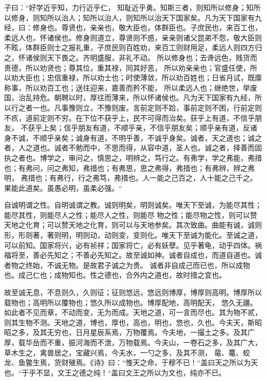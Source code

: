 \documentclass[]{article}
\begin{document}
子曰：``好学近乎知，力行近乎仁，
知耻近乎勇。知斯三者，则知所以修身；知所以修身，则知所以治人；知所以治人，则知所以治天下国家矣。凡为天下国家有九经，曰：修身也。尊贤也，亲亲也，敬大臣也，体群臣也。子庶民也，来百工也，柔远人也，怀诸侯也。修身则道立，尊贤则不惑，亲亲则诸父昆弟不怨，敬大臣则不眩，体群臣则士之报礼重，子庶民则百姓劝，来百工则财用足，柔远人则四方归之，怀诸侯则天下畏之。齐明盛服，非礼不动。
所以修身也；去谗远色，贱货而贵德，所以劝贤也；尊其位，重其禄，同其好恶，
所以劝亲亲也；官盛任使，所以劝大臣也；忠信重禄，所以劝士也；时使薄敛，所以劝百姓也；日省月试，既廪称事，所以劝百工也；送往迎来，嘉善而矜不能，
所以柔远人也；继绝世，举废国，治乱持危。朝聘以时，厚往而薄来，所以怀诸侯也。凡为天下国家有九经，所以行之者一也。凡事豫则立，不豫则废。言前定则不跲，事前定则不困，行前定则不疚，道前定则不穷。在下位不获乎上，民不可得而治矣。获乎上有道，不信乎朋友，
不获乎上矣；信乎朋友有道，不顺乎亲，不信乎朋友矣；顺乎亲有道，反诸身不诚，不顺乎亲矣；诚身有道，不明乎善，不诚乎身矣。诚者，天之道也；诚之者，人之道也。诚者不勉而中，不思而得，从容中道，圣人也。诚之者，择善而固执之者也。博学之，审问之，慎思之，明辨之，笃行之。有弗学，学之弗能，弗措也；有弗问，问之弗知，弗措也；有弗思，思之弗得，弗措也；有弗辨，辨之弗明，
弗措也；有弗行，行之弗笃，弗措也。人一能之己百之，人十能之己千之。果能此道矣。虽愚必明，虽柔必强。``

自诚明谓之性。自明诚谓之教。诚则明矣，明则诚矣。唯天下至诚，为能尽其性；能尽其性，则能尽人之性；能尽人之性，则能尽
物之性；能尽物之性，则可以赞天地之化育；可以赞天地之化育，则可以与天地参矣。其次致曲。曲能有诚，诚则形，形则著，著则明，明则动，动则变，变则化。唯天下至诚为能化。至诚之道，可以前知。国家将兴，必有祯祥；国家将亡，必有妖孽。见乎著龟，动乎四体。祸福将至，善必先知之；不善必先知之。故至诚如神。诚者自成也，而道自道也。诚者物之终始，不诚无物。是故君子诚之为贵。
诚者非自成己而已也，所以成物也。成己仁也；成物知也。性之德也，合外内之道也，故时措之宜也。

故至诚无息，不息则久，久则征；征则悠远，悠远则博厚，博厚则高明。博厚所以载物也；高明所以覆物也；悠久所以成物也。博厚配地，高明配天，
悠久无疆。如此者不见而章，不动而变，无为而成。天地之道，可一言而尽也。其为物不贰，则其生物不测。天地之道，博也，厚也，高也，明也，悠也，久也。今夫天，斯昭昭之多，及其无穷也，日月星辰系焉，万物覆焉。今夫地，一撮土之多。及其广厚，载华岳而不重，振河海而不泄，万物载焉。今夫山，一卷石之多，及其广大，草木生之，禽兽居之，宝藏兴焉，今夫水，一勺之多，及其不测，
鼋、鼍、蛟龙、鱼鳖生焉，货财殖焉。《诗》曰：``惟天之命，于穆不已！``盖曰天之所以为天也。``于乎不显，文王之德之纯！``盖曰文王之所以为文也，纯亦不已。
\end{document}
